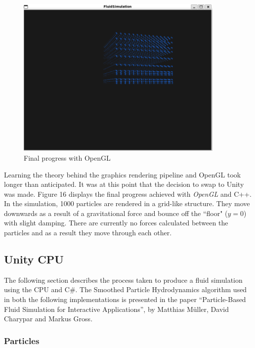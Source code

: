 \documentclass[12pt]{article}
\begin{document}
    \begin{figure}[H]
        \begin{center}
            \includegraphics[width=0.9\textwidth]{openGLProg.png}
            \caption{Final progress with OpenGL}
        \end{center}
    \end{figure}
    
    Learning the theory behind the graphics rendering pipeline and OpenGL took longer than anticipated. It was at this point that the decision to swap to Unity was made. Figure 16 displays the final progress achieved with \textit{OpenGL} and C++. In the simulation, 1000 particles are rendered in a grid-like structure. They move downwards as a result of a gravitational force and bounce off the ``floor" ($y = 0$) with slight damping. There are currently no forces calculated between the particles and as a result they move through each other.

    \subsection{Unity CPU}

    The following section describes the process taken to produce a fluid simulation using the CPU and C\#. The Smoothed Particle Hydrodynamics algorithm used in both the following implementations is presented in the paper ``Particle-Based Fluid Simulation for Interactive Applications'', by Matthias Müller, David Charypar and Markus Gross\cite{sca}.

    \subsubsection{Particles}
\end{document}
